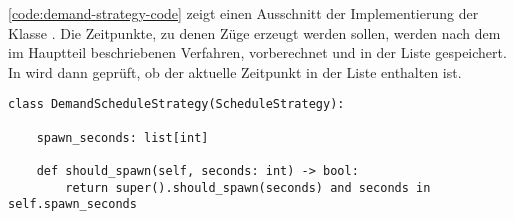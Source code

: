 \autoref{code:demand-strategy-code} zeigt einen Ausschnitt der Implementierung der Klasse . Die Zeitpunkte, zu denen Züge erzeugt werden sollen, werden nach dem im Hauptteil beschriebenen Verfahren, vorberechnet und in der Liste  gespeichert. In  wird dann geprüft, ob der aktuelle Zeitpunkt in der Liste enthalten ist.

\begin{lstlisting}[caption={Ausschnitt aus der Klasse \code{DemandScheduleStrategy} mit der Implementierung der Methode \code{should\_spawn}.}, label=code:demand-strategy-code]
class DemandScheduleStrategy(ScheduleStrategy):

    spawn_seconds: list[int]

    def should_spawn(self, seconds: int) -> bool:
        return super().should_spawn(seconds) and seconds in self.spawn_seconds

\end{lstlisting}

